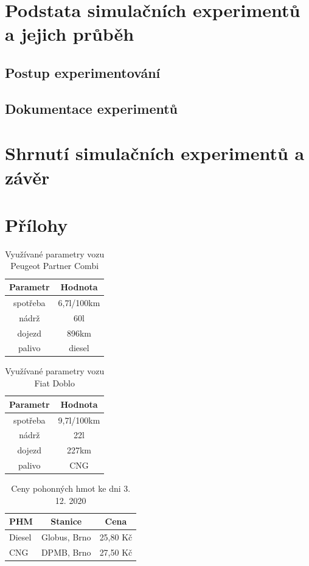 \documentclass[a4paper, 11pt]{article}
\begin{document}
\section{Podstata simulačních experimentů a jejich průběh}
\subsection{Postup experimentování}
\subsection{Dokumentace experimentů}
\section{Shrnutí simulačních experimentů a závěr}


\section*{Přílohy}
\begin{table}[h]
\centering
\begin{tabular}{cc}
\textbf{Parametr} & \textbf{Hodnota}                                                                                   \\ \hline
spotřeba & 6,7l/100km \\ \hline
nádrž  & 60l \\ \hline                      
dojezd &  896km \\ \hline
palivo & diesel
\end{tabular}
\caption{Využívané parametry vozu Peugeot Partner Combi}
\label{tab:1}
\end{table}

\begin{table}[h]
\centering
\begin{tabular}{cc}
\textbf{Parametr} & \textbf{Hodnota}                                                                                   \\ \hline
spotřeba & 9,7l/100km \\ \hline
nádrž  & 22l \\ \hline
dojezd &  227km \\ \hline
palivo & CNG
\end{tabular}
\caption{Využívané parametry vozu Fiat Doblo}
\label{tab:2}
\end{table}

\begin{table}[h]
\centering
\begin{tabular}{lcc}
\textbf{PHM} & \textbf{Stanice} & \textbf{Cena}                                                                                   \\ \hline
Diesel & Globus, Brno & 25,80 Kč \\ \hline
CNG & DPMB, Brno & 27,50 Kč
\end{tabular}
\caption{Ceny pohonných hmot ke dni 3. 12. 2020}
\label{tab:3}
\end{table}


 

\end{document}
